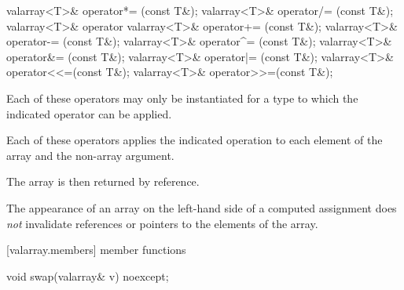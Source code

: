 %
%
%
%
%
%
%
%
%
%
%
%
%
%
%
%
%
%
%
%
\begin{itemdecl}
valarray<T>& operator*= (const T&);
valarray<T>& operator/= (const T&);
valarray<T>& operator%
valarray<T>& operator+= (const T&);
valarray<T>& operator-= (const T&);
valarray<T>& operator^= (const T&);
valarray<T>& operator&= (const T&);
valarray<T>& operator|= (const T&);
valarray<T>& operator<<=(const T&);
valarray<T>& operator>>=(const T&);
\end{itemdecl}

\begin{itemdescr}
\pnum
Each of these operators may only be instantiated for a type 
to which the indicated operator can be applied.

\pnum
Each of these operators applies the indicated operation to each element
of the array and the non-array argument.

\pnum
The array is then returned by reference.

\pnum
The appearance of an array on the left-hand side of a computed assignment
does
\textit{not}
invalidate references or pointers to the elements of the array.
\end{itemdescr}

[valarray.members]{ member functions}

%
%
\begin{itemdecl}
void swap(valarray& v) noexcept;
\end{itemdecl}

